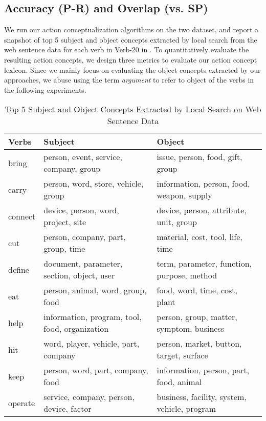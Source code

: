 \subsection{Accuracy (P-R) and Overlap (vs. SP)}
We run our action conceptualization algorithms on the two dataset,
and report a snapshot of top 5 subject and object concepts extracted
by local search from the web sentence data
for each verb in Verb-20 in .
To quantitatively evaluate the resulting action concepts,
we design three metrics to evaluate our action concept lexicon.
Since we mainly focus on evaluating the object concepts extracted by
our approaches, we abuse using the term \emph{argument}
to refer to object of the verbs in the following experiments.

\begin{table*}[th]
\centering
\caption{Top 5 Subject and Object Concepts Extracted by Local Search on Web Sentence Data}
\small
\begin{tabular}{|l|l|l|}
    \hline
    Verbs & Subject & Object \\
    \hline \hline
    bring & person, event, service, company, group & issue, person, food, gift, group \\
    \hline
    carry & person, word, store, vehicle, group & information, person, food, weapon, supply \\
    \hline
    connect & device, person, word, project, site & device, person, attribute, unit, group \\
    \hline
    cut   & person, company, part, group, time & material, cost, tool, life, time \\
    \hline
    define & document, parameter, section, object, user & term, parameter, function, purpose, method \\
    \hline
    eat   & person, animal, word, group, food & food, word, time, cost, plant \\
    \hline
    help  & information, program, tool, food, organization & person, group, matter, symptom, business \\
    \hline
    hit   & word, player, vehicle, part, company & person, market, button, target, surface \\
    \hline
    keep  & person, word, part, company, food & information, person, part, food, animal \\
    \hline
    operate & service, company, person, device, factor & business, facility, system, vehicle, program \\

\end{tabular}
\end{table*}
